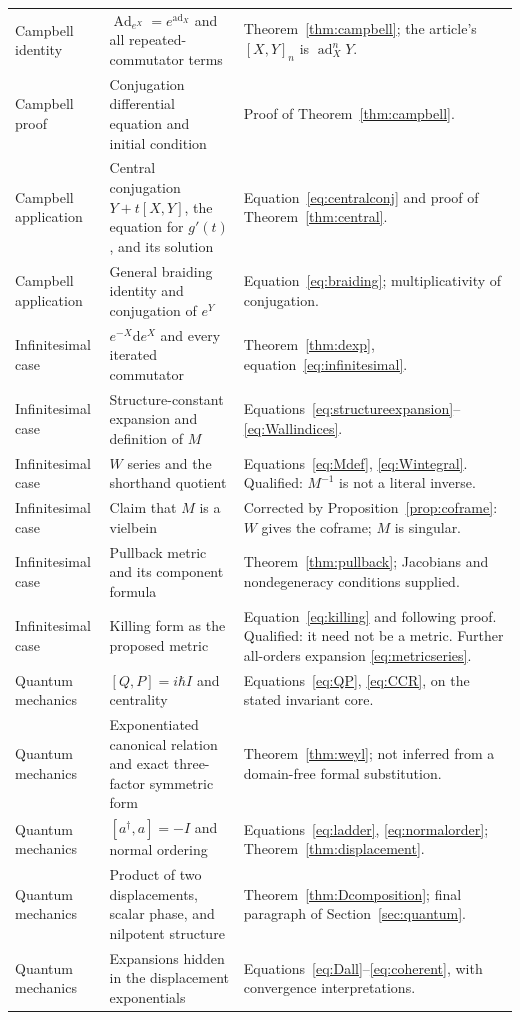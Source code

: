 \documentclass[11pt]{article}
\theoremstyle{definition}
\theoremstyle{remark}
\newcommand{\dd}{\mathrm d}
\newcommand{\ad}{\operatorname{ad}}
\newcommand{\Ad}{\operatorname{Ad}}
\numberwithin{equation}{section}
\begin{document}
\begin{longtable}{@{}>{\raggedright\arraybackslash}p{}>{\raggedright\arraybackslash}p{}>{\raggedright\arraybackslash}p{}@{}}
Campbell identity&$\Ad_{e^X}=e^{\ad_X}$ and all repeated-commutator terms&Theorem~\ref{thm:campbell}; the article's $[X,Y]_n$ is $\ad_X^nY$.\\
Campbell proof&Conjugation differential equation and initial condition&Proof of Theorem~\ref{thm:campbell}.\\
Campbell application&Central conjugation $Y+t[X,Y]$, the equation for $g'(t)$, and its solution&Equation~\eqref{eq:centralconj} and proof of Theorem~\ref{thm:central}.\\
Campbell application&General braiding identity and conjugation of $e^Y$&Equation~\eqref{eq:braiding}; multiplicativity of conjugation.\\
Infinitesimal case&$e^{-X}\dd e^X$ and every iterated commutator&Theorem~\ref{thm:dexp}, equation~\eqref{eq:infinitesimal}.\\
Infinitesimal case&Structure-constant expansion and definition of $M$&Equations~\eqref{eq:structureexpansion}--\eqref{eq:Wallindices}.\\
Infinitesimal case&$W$ series and the shorthand quotient&Equations~\eqref{eq:Mdef}, \eqref{eq:Wintegral}. Qualified: $M^{-1}$ is not a literal inverse.\\
Infinitesimal case&Claim that $M$ is a vielbein&Corrected by Proposition~\ref{prop:coframe}: $W$ gives the coframe; $M$ is singular.\\
Infinitesimal case&Pullback metric and its component formula&Theorem~\ref{thm:pullback}; Jacobians and nondegeneracy conditions supplied.\\
Infinitesimal case&Killing form as the proposed metric&Equation~\eqref{eq:killing} and following proof. Qualified: it need not be a metric. Further all-orders expansion \eqref{eq:metricseries}.\\
Quantum mechanics&$[Q,P]=i\hbar I$ and centrality&Equations~\eqref{eq:QP}, \eqref{eq:CCR}, on the stated invariant core.\\
Quantum mechanics&Exponentiated canonical relation and exact three-factor symmetric form&Theorem~\ref{thm:weyl}; not inferred from a domain-free formal substitution.\\
Quantum mechanics&$[a^\dagger,a]=-I$ and normal ordering&Equations~\eqref{eq:ladder}, \eqref{eq:normalorder}; Theorem~\ref{thm:displacement}.\\
Quantum mechanics&Product of two displacements, scalar phase, and nilpotent structure&Theorem~\ref{thm:Dcomposition}; final paragraph of Section~\ref{sec:quantum}.\\
Quantum mechanics&Expansions hidden in the displacement exponentials&Equations~\eqref{eq:Dall}--\eqref{eq:coherent}, with convergence interpretations.\\
\end{longtable}
\endgroup
\end{document}
